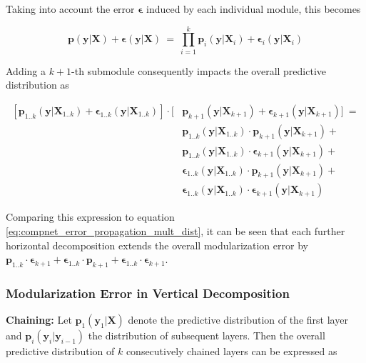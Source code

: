 Taking into account the error $\boldsymbol{\epsilon}$ induced by each individual module, this becomes

\begin{equation}
\label{eq:compnet_error_propagation_mult_dist_err}
    \textbf{p}(\textbf{y}|\textbf{X})+\boldsymbol{\epsilon}(\textbf{y}|\textbf{X})\ =\ \prod_{i=1}^k\textbf{p}_i(\textbf{y}|\textbf{X}_i)+\boldsymbol{\epsilon}_i(\textbf{y}|\textbf{X}_i)
\end{equation}

Adding a $k+1$-th submodule consequently impacts the overall predictive distribution as

\begin{equation}
\label{eq:compnet_error_propagation_mult_dist_err_additional_module}
\begin{split}
    [\textbf{p}_{1..k}(\textbf{y}|\textbf{X}_{1..k})+\boldsymbol{\epsilon}_{1..k}(\textbf{y}|\textbf{X}_{1..k})]\cdot[&\textbf{p}_{k+1}(\textbf{y}|\textbf{X}_{k+1})+\boldsymbol{\epsilon}_{k+1}(\textbf{y}|\textbf{X}_{k+1})]\ =\\
    & \textbf{p}_{1..k}(\textbf{y}|\textbf{X}_{1..k})\cdot\textbf{p}_{k+1}(\textbf{y}|\textbf{X}_{k+1})+\\
    & \textbf{p}_{1..k}(\textbf{y}|\textbf{X}_{1..k})\cdot\boldsymbol{\epsilon}_{k+1}(\textbf{y}|\textbf{X}_{k+1})+\\
    & \boldsymbol{\epsilon}_{1..k}(\textbf{y}|\textbf{X}_{1..k})\cdot\textbf{p}_{k+1}(\textbf{y}|\textbf{X}_{k+1})+\\
    & \boldsymbol{\epsilon}_{1..k}(\textbf{y}|\textbf{X}_{1..k})\cdot\boldsymbol{\epsilon}_{k+1}(\textbf{y}|\textbf{X}_{k+1})
\end{split}
\end{equation}

Comparing this expression to equation \ref{eq:compnet_error_propagation_mult_dist}, it can be seen that each further horizontal decomposition extends the overall modularization error by $\textbf{p}_{1..k}\cdot\boldsymbol{\epsilon}_{k+1}+\boldsymbol{\epsilon}_{1..k}\cdot\textbf{p}_{k+1}+\boldsymbol{\epsilon}_{1..k}\cdot\boldsymbol{\epsilon}_{k+1}$.

\subsubsection{Modularization Error in Vertical Decomposition}

\textbf{Chaining:} Let $\textbf{p}_{1}(\textbf{y}_1|\textbf{X})$ denote the predictive distribution of the first layer and $\textbf{p}_{i}(\textbf{y}_i|\textbf{y}_{i-1})$ the distribution of subsequent layers. Then the overall predictive distribution of $k$ consecutively chained layers can be expressed as

